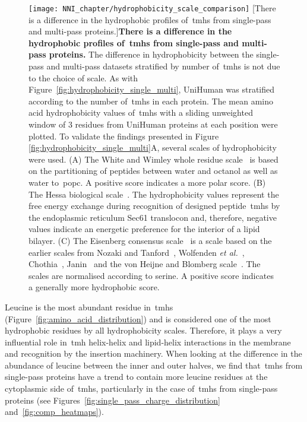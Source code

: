 \begin{figure}[!ht]
\centering
\texttt{[image: NNI\_chapter/hydrophobicity\_scale\_comparison]}
[There is a difference in the hydrophobic profiles of~\gls{tmh}s from single-pass and multi-pass proteins.]{\textbf{There is a difference in the hydrophobic profiles of~\gls{tmh}s from single-pass and multi-pass proteins.}
The difference in hydrophobicity between the single-pass and multi-pass datasets stratified by number of~\gls{tmh}s is not due to the choice of scale.
As with Figure~\ref{fig:hydrophobicity_single_multi}, UniHuman was stratified according to the number of~\gls{tmh}s in each protein.
The mean amino acid hydrophobicity values of~\gls{tmh}s with a sliding unweighted window of 3 residues from UniHuman proteins at each position were plotted.
To validate the findings presented in Figure \ref{fig:hydrophobicity_single_multi}A, several scales of hydrophobicity were used.
(A) The White and Wimley whole residue scale~\cite{White1999} is based on the partitioning of peptides between water and octanol as well as water to~\gls{popc}.
A positive score indicates a more polar score.
(B) The Hessa biological scale~\cite{Hessa2005}.
The hydrophobicity values represent the free energy exchange during recognition of designed peptide~\gls{tmh}s by the endoplasmic reticulum Sec61 translocon and, therefore, negative values indicate an energetic preference for the interior of a lipid bilayer.
(C) The Eisenberg consensus scale~\cite{Eisenberg1984} is a scale based on the earlier scales from Nozaki and Tanford~\cite{Nozaki1971}, Wolfenden \textit{et al.}~\cite{Wolfenden1981}, Chothia~\cite{Chothia1976}, Janin~\cite{Janin1979} and the von Heijne and Blomberg scale~\cite{VonHeijne1979}.
The scales are normalised according to serine.
A positive score indicates a generally more hydrophobic score.}

\label{fig:hydrophobicity_scale_comparison}
\end{figure}

Leucine is the most abundant residue in~\gls{tmh}s (Figure~\ref{fig:amino_acid_distribution}) and is considered one of the most hydrophobic residues by all hydrophobicity scales.
Therefore, it plays a very influential role in~\gls{tmh} helix-helix and lipid-helix interactions in the membrane and recognition by the insertion machinery.
When looking at the difference in the abundance of leucine between the inner and outer halves, we find that~\gls{tmh}s from single-pass proteins have a trend to contain more leucine residues at the cytoplasmic side of~\gls{tmh}s, particularly in the case of~\gls{tmh}s from single-pass proteins (see Figures~\ref{fig:single_pass_charge_distribution} and~\ref{fig:comp_heatmaps}).


